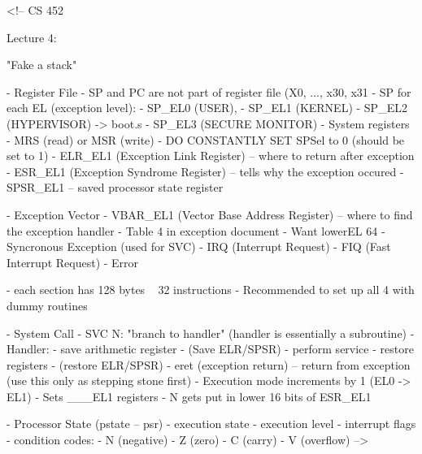 <!-- CS 452


Lecture 4:

"Fake a stack"

- Register File
   - SP and PC are not part of register file (X0, ..., x30, x31
   - SP for each EL (exception level): 
      - SP_EL0 (USER),
      - SP_EL1 (KERNEL)
      - SP_EL2 (HYPERVISOR) -> boot.s
      - SP_EL3 (SECURE MONITOR)
   - System registers 
      - MRS (read) or MSR (write)
      - DO CONSTANTLY SET SPSel to 0 (should be set to 1)
      - ELR_EL1 (Exception Link Register) -- where to return after exception
      - ESR_EL1 (Exception Syndrome Register) -- tells why the exception occured
      - SPSR_EL1 -- saved processor state register

      - Exception Vector
         - VBAR_EL1 (Vector Base Address Register) -- where to find the exception handler 
         - Table 4 in exception document 
            - Want lowerEL 64
               - Syncronous Exception (used for SVC)
               - IRQ (Interrupt Request)
               - FIQ (Fast Interrupt Request)
               - Error 

               - each section has 128 bytes ~ 32 instructions
            - Recommended to set up all 4 with dummy routines

      

- System Call
   - SVC N: "branch to handler" (handler is essentially a subroutine)
   - Handler:
      - save arithmetic register 
      - (Save ELR/SPSR)
      - perform service
      - restore registers
      - (restore ELR/SPSR)
      - eret (exception return) -- return from exception (use this only as stepping stone first)
   - Execution mode increments by 1 (EL0 -> EL1)
   - Sets ___EL1 registers
   - N gets put in lower 16 bits of ESR_EL1


- Processor State (pstate -- psr)
   - execution state
   - execution level
   - interrupt flags
   - condition codes:
      - N (negative)
      - Z (zero)
      - C (carry)
      - V (overflow)
-->